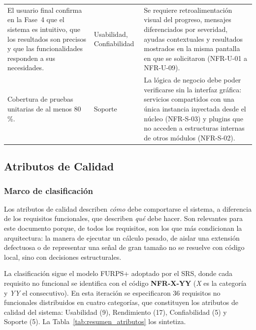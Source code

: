 \documentclass[11pt,a4paper]{article}
\DeclareRobustCommand{\_}{\textunderscore\allowbreak}
\begin{document}
\begin{longtable}{@{}>{\raggedright\arraybackslash}p{5.2cm}
                  >{\raggedright\arraybackslash}p{2.6cm}
                  >{\raggedright\arraybackslash}p{6.9cm}@{}}
El usuario final confirma en la Fase~4 que el sistema es intuitivo, que los resultados son precisos y que las funcionalidades responden a sus necesidades.
&
Usabilidad, Confiabilidad
&
Se requiere retroalimentación visual del progreso, mensajes diferenciados por severidad, ayudas contextuales y resultados mostrados en la misma pantalla en que se solicitaron (NFR-U-01 a NFR-U-09).
\\[0.2cm]

Cobertura de pruebas unitarias de al menos 80\,\%.
&
Soporte
&
La lógica de negocio debe poder verificarse sin la interfaz gráfica: servicios compartidos con una única instancia inyectada desde el núcleo (NFR-S-03) y plugins que no acceden a estructuras internas de otros módulos (NFR-S-02).
\\

\end{longtable}

\subsection{Atributos de Calidad}
\label{sec:atributos_calidad}

\subsubsection{Marco de clasificación}

Los atributos de calidad describen \textit{cómo} debe comportarse el sistema, a diferencia de los requisitos funcionales, que describen \textit{qué} debe hacer. Son relevantes para este documento porque, de todos los requisitos, son los que más condicionan la arquitectura: la manera de ejecutar un cálculo pesado, de aislar una extensión defectuosa o de representar una señal de gran tamaño no se resuelve con código local, sino con decisiones estructurales.

La clasificación sigue el modelo FURPS+ \cite{eeles2001} adoptado por el SRS, donde cada requisito no funcional se identifica con el código \textbf{NFR-X-YY} (\textit{X} es la categoría y \textit{YY} el consecutivo). En esta iteración se especificaron 36 requisitos no funcionales distribuidos en cuatro categorías, que constituyen los atributos de calidad del sistema: Usabilidad (9), Rendimiento (17), Confiabilidad (5) y Soporte (5). La Tabla~\ref{tab:resumen_atributos} los sintetiza.
\end{document}
